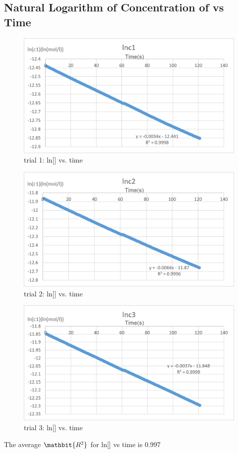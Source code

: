 \documentclass{article}
\begin{document}
\subsection{Natural Logarithm of Concentration of  vs Time}
\begin{figure}[H] 
\centering
\includegraphics[scale=0.9]{lnc1.png}
\caption{trial 1: ln[] vs. time}
\end{figure}
\begin{figure}[H] 
\centering
\includegraphics[scale=0.9]{lnc2.png}
\caption{trial 2: ln[] vs. time}
\end{figure}
\begin{figure}[H] 
\centering
\includegraphics[scale=0.9]{lnc3.png}
\caption{trial 3: ln[] vs. time}
\end{figure}
The average $\mathbit{R^2}$ for ln[] vs time is 0.997
\end{document}
